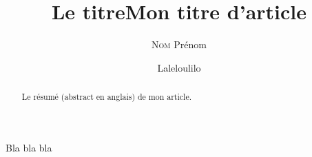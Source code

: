 \documentclass[a4paper,10pt]{report}
\title{Le titre}
\author{\textsc{Nom} Prénom}
\date{} %
\title{Mon titre d'article}
\date{}
\author{Laleloulilo}
\begin{document}
\maketitle

\begin{abstract}
Le résumé (abstract en anglais) de mon article.
\end{abstract}


\tableofcontents


Bla bla bla

\listoffigures
\listoftables
\printindex
\end{document}
